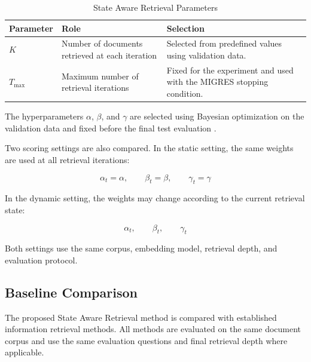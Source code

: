\documentclass[12pt,a4paper]{report}
\begin{document}
\begin{table}[H]
\centering
\caption{State Aware Retrieval Parameters}
\label{tab:sar-parameters}
\renewcommand{\arraystretch}{1.2}
\begin{tabular}{|p{1.45in}|p{1.75in}|p{2.9in}|}
\hline
\textbf{Parameter} & \textbf{Role} & \textbf{Selection} \\ \hline
$K$ & Number of documents retrieved at each iteration &
Selected from predefined values using validation data. \\ \hline
$T_{\max}$ & Maximum number of retrieval iterations &
Fixed for the experiment and used with the MIGRES stopping condition. \\ \hline
\end{tabular}
\end{table}

The hyperparameters $\alpha$, $\beta$, and $\gamma$ are selected using
Bayesian optimization on the validation data and fixed before the final
test evaluation \cite{snoek2012practical}.

Two scoring settings are also compared. In the static setting, the
same weights are used at all retrieval iterations:

\[
\alpha_t=\alpha,\qquad
\beta_t=\beta,\qquad
\gamma_t=\gamma
\]

In the dynamic setting, the weights may change according to the current
retrieval state:

\[
\alpha_t,\qquad
\beta_t,\qquad
\gamma_t
\]

Both settings use the same corpus, embedding model, retrieval depth,
and evaluation protocol.

\subsection{Baseline Comparison}

The proposed State Aware Retrieval method is compared with established
information retrieval methods. All methods are evaluated on the same
document corpus and use the same evaluation questions and final
retrieval depth where applicable.
\end{document}
